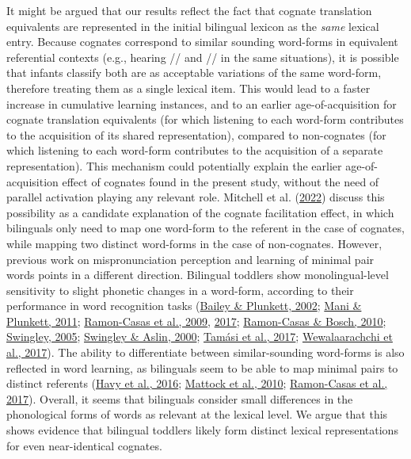 \documentclass[
]{article}
\begin{document}
It might be argued that our results reflect the fact that cognate
translation equivalents are represented in the initial bilingual lexicon
as the \emph{same} lexical entry. Because cognates correspond to similar
sounding word-forms in equivalent referential contexts (e.g., hearing
// and // in the same situations), it is
possible that infants classify both are as acceptable variations of the
same word-form, therefore treating them as a single lexical item. This
would lead to a faster increase in cumulative learning instances, and to
an earlier age-of-acquisition for cognate translation equivalents (for
which listening to each word-form contributes to the acquisition of its
shared representation), compared to non-cognates (for which listening to
each word-form contributes to the acquisition of a separate
representation). This mechanism could potentially explain the earlier
age-of-acquisition effect of cognates found in the present study,
without the need of parallel activation playing any relevant role.
Mitchell et al. (\protect\hyperlink{ref-mitchell2022cognates}{2022})
discuss this possibility as a candidate explanation of the cognate
facilitation effect, in which bilinguals only need to map one word-form
to the referent in the case of cognates, while mapping two distinct
word-forms in the case of non-cognates. However, previous work on
mispronunciation perception and learning of minimal pair words points in
a different direction. Bilingual toddlers show monolingual-level
sensitivity to slight phonetic changes in a word-form, according to
their performance in word recognition tasks
(\protect\hyperlink{ref-bailey2002phonological}{Bailey \& Plunkett,
2002}; \protect\hyperlink{ref-mani2011does}{Mani \& Plunkett, 2011};
\protect\hyperlink{ref-ramon-casas2009vowel}{Ramon-Casas et al., 2009},
\protect\hyperlink{ref-ramon-casas2017minimalpair}{2017};
\protect\hyperlink{ref-ramon-casas2010are}{Ramon-Casas \& Bosch, 2010};
\protect\hyperlink{ref-swingley200511montholds}{Swingley, 2005};
\protect\hyperlink{ref-swingley2000spoken}{Swingley \& Aslin, 2000};
\protect\hyperlink{ref-tamasi2017pupillometry}{Tamási et al., 2017};
\protect\hyperlink{ref-wewalaarachchi2017vowels}{Wewalaarachchi et al.,
2017}). The ability to differentiate between similar-sounding word-forms
is also reflected in word learning, as bilinguals seem to be able to map
minimal pairs to distinct referents
(\protect\hyperlink{ref-havy2016phonetic}{Havy et al., 2016};
\protect\hyperlink{ref-mattock2010first}{Mattock et al., 2010};
\protect\hyperlink{ref-ramon-casas2017minimalpair}{Ramon-Casas et al.,
2017}). Overall, it seems that bilinguals consider small differences in
the phonological forms of words as relevant at the lexical level. We
argue that this shows evidence that bilingual toddlers likely form
distinct lexical representations for even near-identical cognates.
\end{document}
